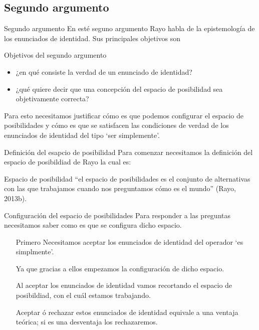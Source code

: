 \documentclass{beamer}
\begin{document}
      \subsection{Segundo argumento}
      \begin{frame}{Segundo argumento}
      En esté seguno argumento Rayo habla de la epistemología 
      de los enunciados de identidad. Sus principales objetivos son
      \begin{block}{Objetivos del segundo argumento} \pause
        \begin{itemize}
          \item  ¿en qué consiste la verdad de un enunciado de identidad? \pause
          \item ¿qué quiere decir que una concepción del espacio de posibilidad 
          sea objetivamente correcta? \pause
        \end{itemize}
      \end{block}
      Para esto necesitamos justificar cómo es que podemos 
      configurar el espacio de posibilidades y cómo es que 
      se satisfacen las condiciones de verdad de los enunciados 
      de identidad del tipo `ser simplemente'. 
      \end{frame}
      \begin{frame}{Definición del esapcio de posibilidad}
        Para comenzar necesitamos la definición del espacio de 
        posibildiad de Rayo la cual es: 
        \begin{block}{Espacio de posibilidad}\pause
          ``el espacio de posibilidades es el 
          conjunto de alternativas con las que trabajamos cuando nos 
          preguntamos cómo es el mundo'' (Rayo, 2013b).
        \end{block}
      \end{frame}
      \begin{frame}{Configuración del espacio de posibilidades}
        Para responder a las preguntas necesitamos saber como es 
        que se configura dicho espacio. 
        \begin{itemize}
          \item [Primero] Necesitamos aceptar los enunciados 
          de identidad del operador `es simplmente'.
          
          \item [] Ya que gracias a ellos empezamos la configuración de dicho 
          espacio. 
          \item[] Al aceptar los enunciados de identidad vamos recortando 
          el espacio de posibildiad, con el cuál estamos trabajando.
          \item[] Aceptar ó rechazar estos enunciados de identidad equivale 
          a una ventaja teórica; si es una desventaja los rechazaremos.  
        \end{itemize}
      \end{frame}
\end{document}

